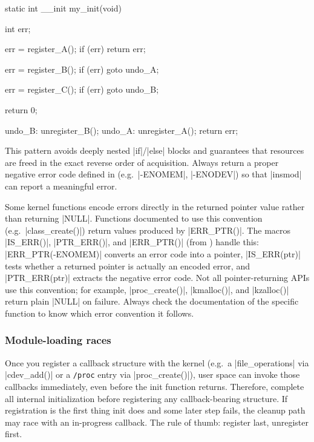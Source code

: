 \documentclass[10pt, oneside]{book}
\begin{document}
\begin{code}
static int __init my_init(void)
{
    int err;

    err = register_A();
    if (err)
        return err;

    err = register_B();
    if (err)
        goto undo_A;

    err = register_C();
    if (err)
        goto undo_B;

    return 0;

undo_B:
    unregister_B();
undo_A:
    unregister_A();
    return err;
}
\end{code}

This pattern avoids deeply nested \cpp|if|/\cpp|else| blocks and guarantees that resources are freed in the exact reverse order of acquisition.
Always return a proper negative error code defined in  (e.g.\ \cpp|-ENOMEM|, \cpp|-ENODEV|) so that \sh|insmod| can report a meaningful error.

Some kernel functions encode errors directly in the returned pointer value rather than returning \cpp|NULL|.
Functions documented to use this convention (e.g.\ \cpp|class_create()|) return values produced by \cpp|ERR_PTR()|.
The macros \cpp|IS_ERR()|, \cpp|PTR_ERR()|, and \cpp|ERR_PTR()| (from ) handle this:
\cpp|ERR_PTR(-ENOMEM)| converts an error code into a pointer,
\cpp|IS_ERR(ptr)| tests whether a returned pointer is actually an encoded error,
and \cpp|PTR_ERR(ptr)| extracts the negative error code.
Not all pointer-returning APIs use this convention; for example, \cpp|proc_create()|, \cpp|kmalloc()|, and \cpp|kzalloc()| return plain \cpp|NULL| on failure.
Always check the documentation of the specific function to know which error convention it follows.

\subsubsection{Module-loading races}
\label{sec:init_races}
Once you register a callback structure with the kernel (e.g.\ a \cpp|file_operations| via \cpp|cdev_add()| or a \verb|/proc| entry via \cpp|proc_create()|), user space can invoke those callbacks immediately, even before the init function returns.
Therefore, complete all internal initialization before registering any callback-bearing structure.
If registration is the first thing init does and some later step fails, the cleanup path may race with an in-progress callback.
The rule of thumb: register last, unregister first.
\end{document}

